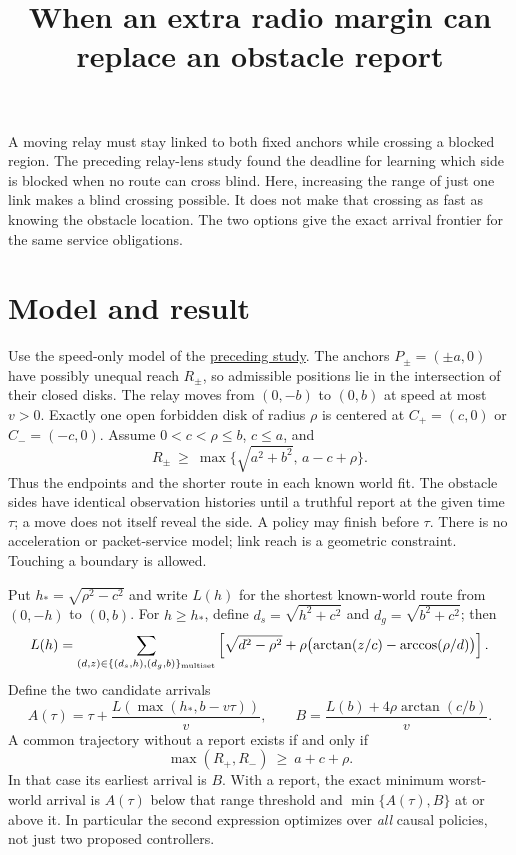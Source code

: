 \documentclass[11pt]{article}
\title{When an extra radio margin can replace an obstacle report}
\date{}
\begin{document}
\maketitle

A moving relay must stay linked to both fixed anchors while crossing
a blocked region. The preceding relay-lens study found the deadline
for learning which side is blocked when no route can cross blind.
Here, increasing the range of just one link makes a blind crossing
possible. It does not make that crossing as fast as knowing the
obstacle location. The two options give the exact arrival frontier
for the same service obligations.

\section{Model and result}
Use the speed-only model of the
\href{https://github.com/eternal-november/eos-research-programmes/pull/396}{preceding study}.
The anchors \(P_\pm=(\pm a,0)\) have possibly unequal reach
\(R_\pm\), so admissible positions lie in the intersection of their
closed disks. The relay moves from \((0,-b)\) to \((0,b)\) at speed
at most \(v>0\). Exactly one open forbidden disk of radius \(\rho\)
is centered at \(C_+=(c,0)\) or \(C_-=(-c,0)\). Assume
\(0<c<\rho\le b\), \(c\le a\), and
\[
  R_\pm\ \ge\ \max\{\sqrt{a^2+b^2},\,a-c+\rho\}.
\]
Thus the endpoints and the shorter route in each known world fit.
The obstacle sides have identical observation histories until a
truthful report at the given time \(\tau\); a move does not itself
reveal the side. A policy may finish before \(\tau\). There is no
acceleration or packet-service model; link reach is a geometric
constraint. Touching a boundary is allowed.

Put \(h_*=\sqrt{\rho^2-c^2}\) and write \(L(h)\) for the shortest
known-world route from \((0,-h)\) to \((0,b)\). For \(h\ge h_*\),
define \(d_s=\sqrt{h^2+c^2}\) and \(d_g=\sqrt{b^2+c^2}\); then
\[
 L(h)=\sum_{(d,z)\in\{(d_s,h),(d_g,b)\}_{\rm multiset}}
 \left[\sqrt{d^2-\rho^2}+
       \rho\bigl(\arctan(z/c)-\arccos(\rho/d)\bigr)\right].
\]
Define the two candidate arrivals
\[
 A(\tau)=\tau+\frac{L(\max(h_*,b-v\tau))}{v},\qquad
 B=\frac{L(b)+4\rho\arctan(c/b)}{v}.
\]
A common trajectory without a report exists if and only if
\[
                  \max(R_+,R_-)\ \ge\ a+c+\rho.
\]
In that case its earliest arrival is \(B\). With a report, the
exact minimum worst-world arrival is \(A(\tau)\) below that
range threshold and \(\min\{A(\tau),B\}\) at or above it.
In particular the second expression optimizes over \emph{all}
causal policies, not just two proposed controllers.
\end{document}
